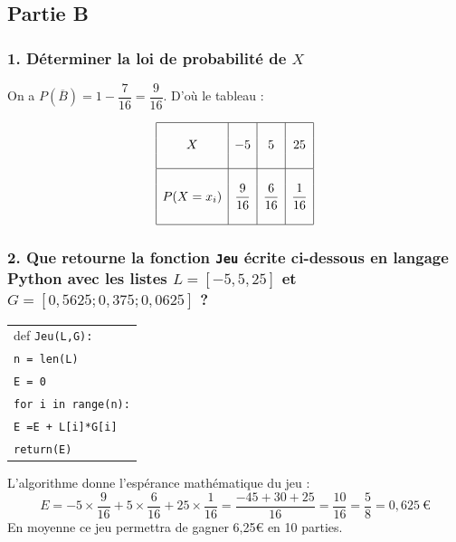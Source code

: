 	\subsection*{Partie B}
	

	
	\subsubsection*{1. Déterminer la loi de probabilité de $X$}
	
	On a $P(\overline{B}) = 1 - \dfrac{7}{16} = \dfrac{9}{16}$. D’où le tableau :
	
	\[
	\begin{array}{|c|c|c|c|}
		\hline
		&&&\\
		X & -5 & 5 & 25 \\
		&&&\\
		\hline
		&&&\\
		P(X = x_i) & \dfrac{9}{16} & \dfrac{6}{16} & \dfrac{1}{16} \\
		&&&\\
		\hline
	\end{array}
	\]
	
	\subsubsection*{2. Que retourne la fonction \texttt{Jeu} écrite ci-dessous en langage Python avec les listes $L = [-5, 5, 25]$ et $G = [0,5625; 0,375; 0,0625]$ ?}
	
\begin{center}
	
	\begin{tabularx}{0.4\linewidth}{|X|}\hline
		def \texttt{Jeu(L,G):}\\
		\quad  \texttt{n = len(L)}\\
		\quad \texttt{E = 0}\\
		\quad \texttt{for i in range(n):}\\
		\qquad \texttt{E =E + L[i]*G[i]} \\
		\quad \texttt{return(E)}\\ \hline
	\end{tabularx}
\end{center}
	
	L’algorithme donne l’espérance mathématique du jeu :
	\[
	E = -5 \times \dfrac{9}{16} + 5 \times \dfrac{6}{16} + 25 \times \dfrac{1}{16} = \dfrac{-45 + 30 + 25}{16} = \dfrac{10}{16} = \dfrac{5}{8} = 0,625~\euro{}
	\]
	En moyenne ce jeu permettra de gagner 6,25€ en 10 parties.

